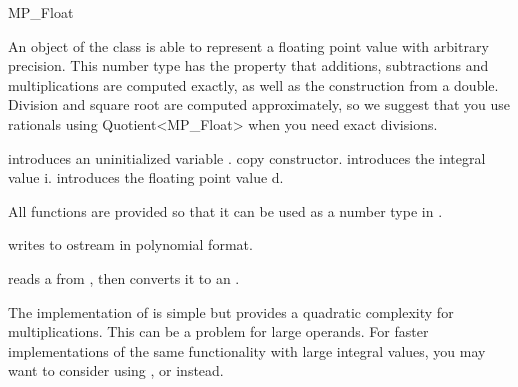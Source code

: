 
\begin{ccClass} {MP_Float}
\label{mpfloat}

\ccDefinition
An object of the class  is able to represent a floating point
value with arbitrary precision.  This number type has the property that
additions, subtractions and multiplications are computed exactly, as well as
the construction from a double.  Division and square root are computed
approximately, so we suggest that you use rationals using Quotient<MP\_Float>
when you need exact divisions.


\ccCreation
{}

{introduces an uninitialized variable \ccVar.}
\ccGlue
{}
{copy constructor.}
\ccGlue
{}
{introduces the integral value i.}
\ccGlue
{}
{introduces the floating point value d.}

\ccOperations
All functions are provided so that it can be used as a number type in
\cgal.

{writes  to ostream  in polynomial format.}

{reads a  from , then converts it to an .}

\end{ccClass} 

\ccImplementation 
The implementation of  is simple but provides a quadratic
complexity for multiplications.  This can be a problem for large operands.
For faster implementations of the same functionality with large integral
values, you may want to consider using ,  or 
instead.

